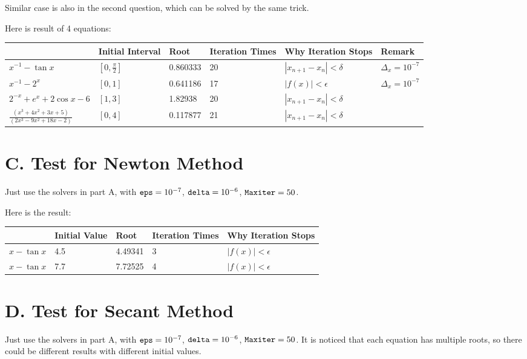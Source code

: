 \documentclass[a4paper]{article}
\begin{document}
Similar case is also in the second question, which can be solved by the same trick.

Here is result of 4 equations:
\begin{table}[!ht]
    \centering
    \begin{tabular}{|l|l|l|l|l|l|}
    \hline
        ~ & Initial Interval& Root & Iteration Times & Why Iteration Stops & Remark \\ \hline
        $x^{-1} - \tan x$ & $[0,\frac{\pi}{2}]$ & 0.860333 & 20 & $|x_{n+1}-x_n| < \delta$ & $\Delta_x = 10^{-7}$ \\ \hline
        $x^{-1} - 2^x$ & $[0,1]$ & 0.641186 & 17 & $|f(x)| < \epsilon$ & $\Delta_x = 10^{-7}$ \\ \hline
        $2^{-x} + e^{x} + 2\cos{x} - 6$ & $[1,3]$ & 1.82938 & 20 & $|x_{n+1}-x_n| < \delta$ & ~ \\ \hline
        $\frac{(x^3 + 4x^2 + 3x + 5)}{(2x^3 - 9x^2 + 18x - 2)}$ & $[0,4]$ & 0.117877 & 21 & $|x_{n+1}-x_n| < \delta$ & ~ \\ \hline
    \end{tabular}
\end{table}

\section*{C. Test for Newton Method}
Just use the solvers in part A, with $\verb|eps| = 10^{-7}$, $\verb|delta| = 10^{-6}$, $\verb|Maxiter| = 50$.

Here is the result:
\begin{table}[!ht]
    \centering
    \begin{tabular}{|l|l|l|l|l|}
    \hline
        ~ & Initial Value& Root & Iteration Times & Why Iteration Stops\\ \hline
        $x - \tan x$ & 4.5 & 4.49341 & 3 & $|f(x)| < \epsilon$ \\ \hline
        $x - \tan x$ & 7.7 & 7.72525 & 4 & $|f(x)| < \epsilon$ \\ \hline
    \end{tabular}
\end{table}

\section*{D. Test for Secant Method}
Just use the solvers in part A, with $\verb|eps| = 10^{-7}$, $\verb|delta| = 10^{-6}$, $\verb|Maxiter| = 50$. It is noticed that each equation has multiple roots,
 so there could be different results with different initial values.
\end{document}
